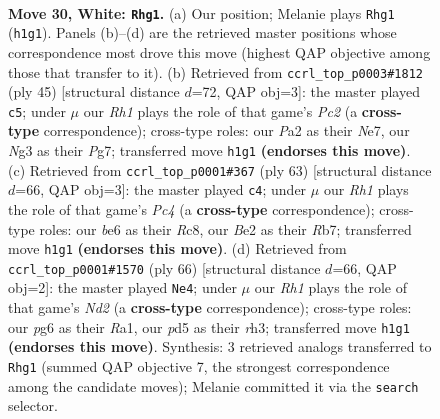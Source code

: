 \documentclass[11pt]{article}
\begin{document}
\clearpage

\begin{figure}[p]\centering
\begin{subfigure}{0.46\textwidth}\centering
\resizebox{\linewidth}{!}{%
\newchessgame
\chessboard[
  setfen={r4k1r/1p3p1p/4b1p1/p2p4/5P2/3K2N1/PP2B1PP/2R4R w - - 1 30},
  showmover=false,
  pgfstyle=straightmove, color=movearrow, markmove={h1-g1}
]}
\caption{}
\end{subfigure}\hfill
\begin{subfigure}{0.46\textwidth}\centering
\resizebox{\linewidth}{!}{%
\newchessgame
\chessboard[
  setfen={4k2r/p1pbnpp1/1p5r/8/3pPP2/PP1B2P1/1NP5/2K1R1R1 b k - 0 23},
  showmover=false,
  pgfstyle=straightmove, color=movearrow, markmove={c7-c5}
]}
\caption{}
\end{subfigure}
\\[4pt]
\begin{subfigure}{0.46\textwidth}\centering
\resizebox{\linewidth}{!}{%
\newchessgame
\chessboard[
  setfen={2r5/1r2k2p/p3bp2/2p3p1/P3P3/3R1PB1/6PP/3R2K1 b - - 0 32},
  showmover=false,
  pgfstyle=straightmove, color=movearrow, markmove={c5-c4}
]}
\caption{}
\end{subfigure}\hfill
\begin{subfigure}{0.46\textwidth}\centering
\resizebox{\linewidth}{!}{%
\newchessgame
\chessboard[
  setfen={3r2k1/3n1pp1/p6p/PppPp3/6P1/7r/1KBN4/R2R4 w - - 3 34},
  showmover=false,
  pgfstyle=straightmove, color=movearrow, markmove={d2-e4}
]}
\caption{}
\end{subfigure}
\caption{\textbf{Move 30, White: \texttt{Rhg1}.} (a) Our position; Melanie plays \texttt{Rhg1} (\texttt{h1g1}). Panels (b)--(d) are the retrieved master positions whose correspondence most drove this move (highest QAP objective among those that transfer to it). (b) Retrieved from \texttt{ccrl\_top\_p0003\#1812} (ply 45) [structural distance $d$=72, QAP obj=3]: the master played \texttt{c5}; under $\mu$ our \emph{Rh1} plays the role of that game's \emph{Pc2} (a \textbf{cross-type} correspondence); cross-type roles: our \emph{P}a2 as their \emph{N}e7, our \emph{N}g3 as their \emph{P}g7; transferred move \texttt{h1g1} \textbf{(endorses this move)}. (c) Retrieved from \texttt{ccrl\_top\_p0001\#367} (ply 63) [structural distance $d$=66, QAP obj=3]: the master played \texttt{c4}; under $\mu$ our \emph{Rh1} plays the role of that game's \emph{Pc4} (a \textbf{cross-type} correspondence); cross-type roles: our \emph{b}e6 as their \emph{R}c8, our \emph{B}e2 as their \emph{R}b7; transferred move \texttt{h1g1} \textbf{(endorses this move)}. (d) Retrieved from \texttt{ccrl\_top\_p0001\#1570} (ply 66) [structural distance $d$=66, QAP obj=2]: the master played \texttt{Ne4}; under $\mu$ our \emph{Rh1} plays the role of that game's \emph{Nd2} (a \textbf{cross-type} correspondence); cross-type roles: our \emph{p}g6 as their \emph{R}a1, our \emph{p}d5 as their \emph{r}h3; transferred move \texttt{h1g1} \textbf{(endorses this move)}. Synthesis: 3 retrieved analogs transferred to \texttt{Rhg1} (summed QAP objective 7, the strongest correspondence among the candidate moves); Melanie committed it via the \texttt{search} selector.}
\label{fig:thought-m58}
\end{figure}
\end{document}
